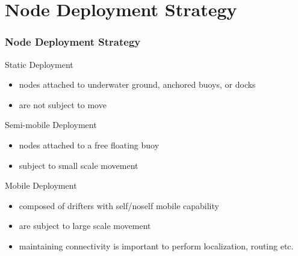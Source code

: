 \documentclass{beamer}
\begin{document}
\section{Node Deployment Strategy}
\begin{frame}
\frametitle{Node Deployment Strategy}
\begin{block}{Static Deployment}
\begin{itemize}
\item nodes attached to underwater ground, anchored buoys, or docks
\item are not subject to move
\end{itemize}
\end{block}
\begin{block}{Semi-mobile Deployment}
\begin{itemize}
\item nodes attached to a free floating buoy
\item subject to small scale movement 
\end{itemize}
\end{block}
\begin{block}{Mobile Deployment}
\begin{itemize}
\item composed of drifters with self/noself mobile capability
\item are subject to large scale movement
\item maintaining connectivity is important to perform localization, routing etc. 
\end{itemize}
\end{block}
\end{frame}
\end{document}
